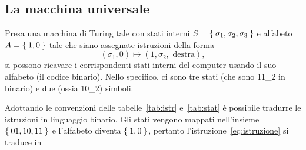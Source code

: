 		\subsection{La macchina universale}
Presa una macchina di Turing tale con stati interni $S=\Set{\sigma_1, \sigma_2, \sigma_3}$ e alfabeto $A=\Set{1, 0}$ tale che siano assegnate istruzioni della forma
\begin{equation}\label{eq:istruzione}
(\sigma_1, 0) \mapsto (1, \sigma_2, \text{ destra}),	%
\end{equation}
si possono ricavare i corrispondenti stati interni del computer usando il suo alfabeto (il codice binario).
Nello specifico, ci sono tre stati  (che sono \num[parse-numbers=false]{11_2} in binario) e due (ossia \num[parse-numbers=false]{10_2}) simboli.
\begin{table}
	\centering
{}\quad
\subfloat[][{Stati interni.}\label{tab:stat}]{%
	\begin{tabular}{l S[parse-numbers=false]}
		\toprule
\emph{Stato}			&{\emph{Numero}}	\\
		\midrule
$\sigma_1$				&01	\\
$\sigma_2$				&10	\\
$\sigma_3$				&11	\\
		\bottomrule
	\end{tabular}
}
	\caption[Macchina di Turing]{Convenzioni binarie per la macchina di Turing.}
\end{table}
Adottando le convenzioni delle tabelle~\ref{tab:istr} e~\ref{tab:stat} è possibile tradurre le istruzioni in linguaggio binario.
Gli stati vengono mappati nell'insieme $\Set{01,10,11}$ e l'alfabeto diventa $\Set{1,0}$, pertanto l'istruzione~\eqref{eq:istruzione} si traduce in

